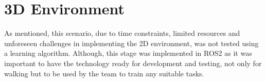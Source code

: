 \section{3D Environment}
As mentioned, this scenario, due to time constraints, limited resources and unforeseen challenges in implementing the 2D environment, was not tested using a learning algorithm. Although, this stage was implemented in ROS2 as it was important to have the technology ready for development and testing, not only for walking but to be used by the team to train any suitable tasks.